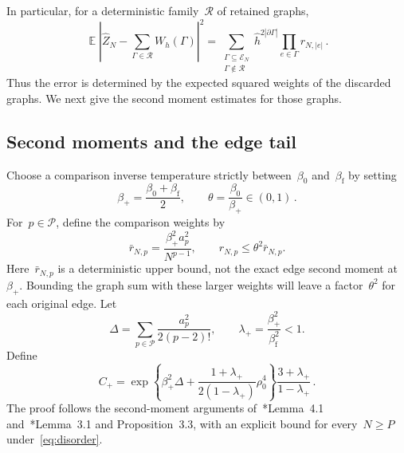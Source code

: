 \documentclass[letterpaper,11pt,reqno]{amsart}
\renewcommand{\leq}{\leqslant}
\renewcommand{\geq}{\geqslant}
\DeclareMathOperator{\E}{\mathds{E}}
\newcommand{\hh}{\hat{h}}
\begin{document}
In particular, for a deterministic family~$\mathcal R$ of retained graphs,
\begin{equation}\label{eq:truncation-isometry}
\E\left|\widehat Z_N-\sum_{\Gamma\in\mathcal R}W_h(\Gamma)\right|^2
=\sum_{\substack{\Gamma\subseteq\mathcal E_N\\\Gamma\notin\mathcal R}}
\hh^{2|\partial\Gamma|}\prod_{e\in\Gamma}r_{N,|e|}\,.
\end{equation}
Thus the error is determined by the expected squared weights of the discarded graphs. We next give the second moment estimates for those graphs.

\subsection{Second moments and the edge tail}\label{subsec:expansion-mass}

Choose a comparison inverse temperature strictly between~$\beta_0$ and~$\beta_{\mathrm f}$ by setting
\begin{equation}\label{eq:algorithm-temperature-constants}
\beta_+=\frac{\beta_0+\beta_{\mathrm f}}2,\qquad
\theta=\frac{\beta_0}{\beta_+}\in(0,1)\,.
\end{equation}
For~$p\in\mathcal P$, define the comparison weights by
\begin{equation*}
\bar r_{N,p}=\frac{\beta_+^2a_p^2}{N^{p-1}},
\qquad r_{N,p}\leq\theta^2\bar r_{N,p}.
\end{equation*}
Here~$\bar r_{N,p}$ is a deterministic upper bound, not the exact edge second moment at~$\beta_+$. Bounding the graph sum with these larger weights will leave a factor~$\theta^2$ for each original edge. Let
\begin{equation*}
\Delta=\sum_{p\in\mathcal P}\frac{a_p^2}{2(p-2)!},
\qquad \lambda_+=\frac{\beta_+^2}{\beta_{\mathrm f}^2}<1.
\end{equation*}
Define
\begin{equation}\label{eq:algorithm-mass-constant}
C_+=\exp\!\left\{\beta_+^2\Delta+\frac{1+\lambda_+}{2(1-\lambda_+)}\rho_0^4\right\}
\frac{3+\lambda_+}{1-\lambda_+}\,.
\end{equation}
The proof follows the second-moment arguments of~\cite{DW23}*{Lemma~4.1} and~\cite{DW26}*{Lemma~3.1 and Proposition~3.3}, with an explicit bound for every~$N\geq P$ under~\eqref{eq:disorder}.
\end{document}
